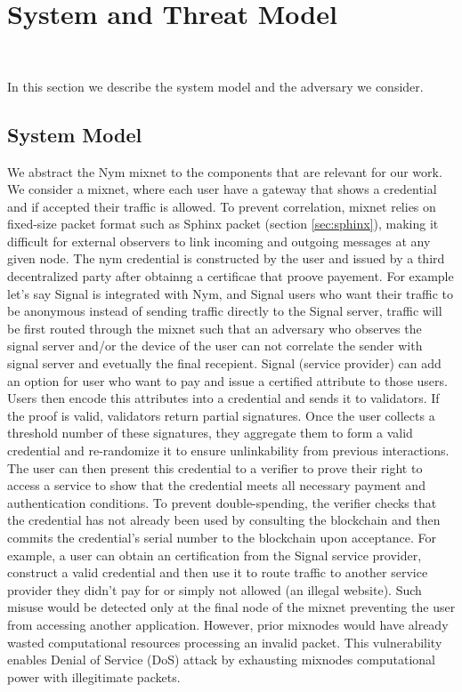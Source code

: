 \section{System and Threat Model}~\label{sec:sys_model}

In this section we describe the system model and the adversary we consider.

\subsection{System Model}

We abstract the Nym mixnet to the components that are relevant for our work. We consider a mixnet, where each user have a gateway that shows a credential and if accepted their traffic is allowed. 
To prevent correlation, mixnet relies on fixed-size packet format such as Sphinx packet (section \ref{sec:sphinx}), making it difficult for external observers to link incoming and outgoing messages at any given node.
 The nym credential is constructed by the user and issued by a third decentralized party after obtainng a certificae that proove payement.
For example let's say Signal is integrated with Nym, and Signal users who want their traffic to be anonymous instead of sending traffic directly to the Signal server, traffic will be first routed through the mixnet such that an adversary who observes the signal server and/or the device of the user can not correlate the sender with signal server and evetually the final recepient. Signal (service provider) can add an option for user who want to pay and issue a certified attribute to those users. Users then encode this attributes into a credential and sends it to validators. If the proof is valid, validators return partial signatures. Once the user collects a threshold number of these signatures, they aggregate them to form a valid credential and re-randomize it to ensure unlinkability from previous interactions. The user can then present this credential to a verifier to prove their right to access a service to show that the credential meets all necessary payment and authentication conditions. To prevent double-spending, the verifier checks that the credential has not already been used by consulting the blockchain and then commits the credential's serial number to the blockchain upon acceptance.
For example, a user can obtain an certification from the Signal service provider, construct a valid credential and then use it to route traffic to another service provider they didn't pay for or simply not allowed (an illegal website).
Such misuse would be detected only at the final node of the mixnet preventing the user from accessing another application. 
However, prior mixnodes would have already wasted computational resources processing an invalid packet. 
This vulnerability enables Denial of Service (DoS) attack by exhausting mixnodes computational power with illegitimate packets.


